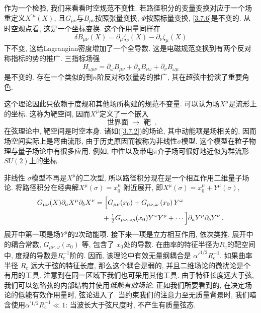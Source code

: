 作为一个检验, 我们来看看时空规范不变性. 若路径积分的变量变换对应于一个场重定义$X^{\prime \mu}(X)$, 且$G_{\mu \nu}$与$B_{\mu \nu}$按照张量变换, $\Phi$按照标量变换, 
\eqref{3.7.6}是不变的. 从时空观点看, 这是一个坐标变换. 这个作用量同样在
\begin{equation}
\delta B_{\mu \nu}(X)=\partial_{\mu} \zeta_{\nu}(X)-\partial_{\nu} \zeta_{\mu}(X)  \label{3.7.7}
\end{equation}
下不变, 这给Lagrangian密度增加了一个全导数. 这是电磁规范变换到有两个反对称指标的势的推广. 三指标场强
\begin{equation}
H_{\omega \mu \nu}=\partial_{\omega} B_{\mu \nu}+\partial_{\mu} B_{\nu \omega}+\partial_{\nu} B_{\omega \mu} \label{3.7.8}
\end{equation}
是不变的. 存在一个类似的到$n$阶反对称张量势的推广, 其在超弦中扮演了重要角色.

这个理论因此只依赖于度规和其他场所构建的规范不变量. 可以认为场$X^\mu$是流形上的坐标. 这称为靶空间, 因而$X^\mu$定义了一个嵌入
\begin{equation}
\text { 世界面 } \rightarrow \text { 靶 } \:. \label{3.7.9}
\end{equation}
在弦理论中, 靶空间是时空本身. 诸如(\ref{3.7.2})的场论, 其中动能项是场相关的, 因而场空间实际上是弯曲流形, 由于历史原因而被称为非线性$\sigma$模型. 
这个模型在粒子物理与量子场论中有很多应用. 例如, 中性以及带电$\pi$介子场可很好地近似为群流形$SU(2)上$的坐标. 

非线性 $\sigma$模型不再是$X^\mu$的二次型, 所以路径积分现在是一个相互作用二维量子场论. 将路径积分在经典解$X^{\mu}(\sigma)=x_{0}^{\mu}$ 附近展开, 即$X^{\mu}(\sigma)=x_{0}^{\mu}+Y^{\mu}(\sigma)$,
\begin{align}
G_{\mu \nu}(X) \partial_{a} X^{\mu} \partial_{b} X^{\nu} &=\Bigl[G_{\mu \nu}(x_{0})+G_{\mu \nu, \omega}\left(x_{0}\right) Y^{\omega}\nonumber \\
&\quad +\tfrac{1}{2} G_{\mu \nu, \omega \rho}(x_{0}) Y^{\omega} Y^{\rho}+\cdots\Bigr] \partial_{a} Y^{\mu} \partial_{b} Y^{\nu} \:. \label{3.7.10}
\end{align}
展开中第一项是场$Y^\mu$的2次动能项. 接下来一项是立方相互作用, 依次类推. 展开中的耦合常数, $G_{\mu \nu, \omega}(x_{0})$
等, 包含了 $x_{0}$处的导数. 在曲率的特征半径为$R_{\mathrm{c}}$的靶空间中, 度规的导数是$R_{\mathrm{c}}^{-1}$阶的. 因而, 该理论中有效无量纲耦合是 $\alpha'^{1 / 2} R_{\mathrm{c}}^{-1}$. 如果曲率半径 $R_{\mathrm{c}}$ 远大于弦的特征长度, 那么这个耦合是弱的, 并且二维场论的微扰论是个有用的工具. 注意到在同一区域下我们也可采用其他工具. 由于特征长度远大于弦, 我们可以忽略弦的内部结构并使用\emph{低能有效场论}. 正如我们所要看到的, 在决定场论的低能有效作用量时, 弦论进入了. 当约束我们的注意力至无质量背景时, 
我们暗含使用$\alpha^{\prime 1 / 2} R_{\mathrm{c}}^{-1} \ll 1$: 当波长大于弦尺度时, 不产生有质量弦态.

